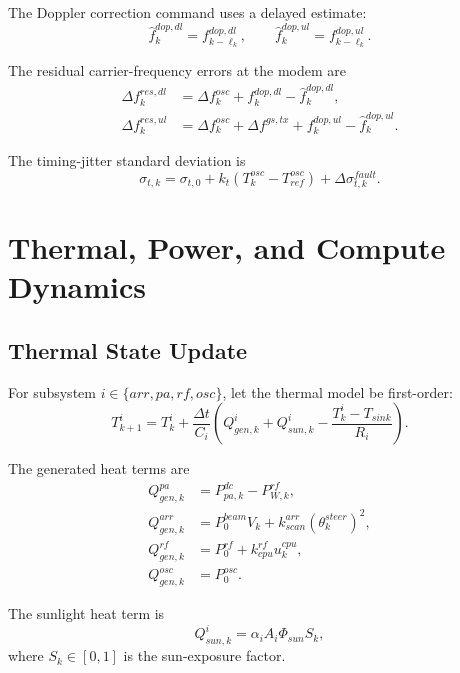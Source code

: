 \documentclass[11pt]{article}
\begin{document}
The Doppler correction command uses a delayed estimate:
\begin{equation}
  \widehat{f}^{dop,dl}_k = f^{dop,dl}_{k-\ell_k},
  \qquad
  \widehat{f}^{dop,ul}_k = f^{dop,ul}_{k-\ell_k}.
\end{equation}

The residual carrier-frequency errors at the modem are
\begin{align}
  \Delta f^{res,dl}_k
  &=
  \Delta f^{osc}_k
  + f^{dop,dl}_k
  - \widehat{f}^{dop,dl}_k, \\
  \Delta f^{res,ul}_k
  &=
  \Delta f^{osc}_k
  + \Delta f^{gs,tx}
  + f^{dop,ul}_k
  - \widehat{f}^{dop,ul}_k.
\end{align}

The timing-jitter standard deviation is
\begin{equation}
  \sigma_{t,k}
  =
  \sigma_{t,0}
  + k_t (T^{osc}_k - T^{osc}_{ref})
  + \Delta \sigma^{fault}_{t,k}.
\end{equation}

\section{Thermal, Power, and Compute Dynamics}

\subsection{Thermal State Update}

For subsystem $i \in \{arr, pa, rf, osc\}$, let the thermal model be first-order:
\begin{equation}
  T^i_{k+1}
  =
  T^i_k
  +
  \frac{\Delta t}{C_i}
  \left(
    Q^i_{gen,k}
    + Q^i_{sun,k}
    - \frac{T^i_k - T_{sink}}{R_i}
  \right).
\end{equation}

The generated heat terms are
\begin{align}
  Q^{pa}_{gen,k}
  &= P^{dc}_{pa,k} - P^{rf}_{W,k}, \\
  Q^{arr}_{gen,k}
  &= P^{beam}_{0}V_k + k^{arr}_{scan}(\theta^{steer}_k)^2, \\
  Q^{rf}_{gen,k}
  &= P^{rf}_{0} + k^{rf}_{cpu}u^{cpu}_k, \\
  Q^{osc}_{gen,k}
  &= P^{osc}_{0}.
\end{align}

The sunlight heat term is
\begin{equation}
  Q^i_{sun,k} = \alpha_i A_i \Phi_{sun} S_k,
\end{equation}
where $S_k \in [0,1]$ is the sun-exposure factor.
\end{document}
